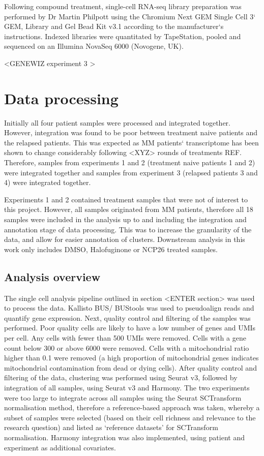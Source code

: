 Following compound treatment, single-cell RNA-seq library preparation was performed by Dr Martin Philpott using the Chromium Next GEM Single Cell 3` GEM, Library and Gel Bead Kit v3.1 according to the manufacturer`s instructions.
Indexed libraries were quantitated by TapeStation, pooled and sequenced on an Illumina NovaSeq 6000 (Novogene, UK).

<GENEWIZ experiment 3 >


\section{Data processing}
Initially all four patient samples were processed and integrated together.
However, integration was found to be poor between treatment naive patients and the relapsed patients.
This was expected as MM patients` transcriptome has been shown to change considerably following <XYZ> rounds of treatments {REF}.
Therefore, samples from experiments 1 and 2 (treatment naive patients 1 and 2) were integrated together and samples from experiment 3 (relapsed patients 3 and 4) were integrated together.

Experiments 1 and 2 contained treatment samples that were not of interest to this project.
However, all samples originated from MM patients, therefore all 18 samples were included in the analysis up to and including the integration and annotation stage of data processing.
This was to increase the granularity of the data, and allow for easier annotation of clusters.
Downstream analysis in this work only includes DMSO, Halofuginone or NCP26 treated samples.

\subsection{Analysis overview}

The single cell analysis pipeline outlined in section <ENTER section> was used to process the data.
Kallisto BUS/ BUStools was used to pseudoalign reads and quantify gene expression.
Next, quality control and filtering of the samples was performed.
Poor quality cells are likely to have a low number of genes and UMIs per cell.
Any cells with fewer than 500 UMIs were removed.
Cells with a gene count below 300 or above 6000 were removed.
Cells with a mitochondrial ratio higher than 0.1 were removed (a high proportion of mitochondrial genes indicates mitochondrial contamination from dead or dying cells).
After quality control and filtering of the data, clustering was performed using Seurat v3, followed by integration of all samples, using Seurat v3 and Harmony.
The two experiments were too large to integrate across all samples using the Seurat SCTransform normalisation method, therefore a reference-based approach was taken, whereby a subset of samples were selected (based on their cell richness and relevance to the research question) and listed as `reference datasets' for SCTransform normalisation.
Harmony integration was also implemented, using patient and experiment as additional covariates.


